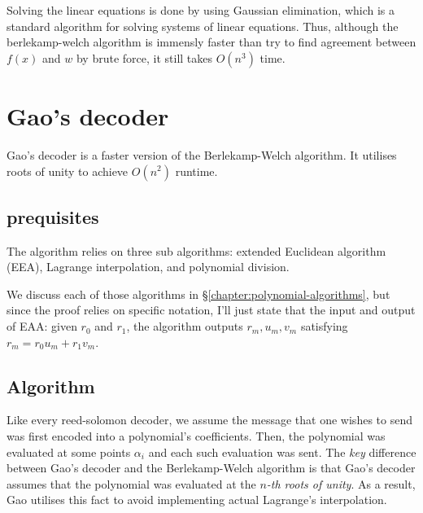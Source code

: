 Solving the linear equations is done by using Gaussian elimination,
which is a standard algorithm for solving systems of linear equations.
Thus, although the berlekamp-welch algorithm is immensly faster than try to find agreement 
between $f(x)$ and $w$ by brute force, it still takes $O(n^3)$ time. 




\section{Gao's decoder}
Gao's decoder is a faster version of the Berlekamp-Welch algorithm.
It utilises roots of unity to achieve $O(n^2)$ runtime.

\subsection{prequisites}
The algorithm relies on three sub algorithms: extended Euclidean algorithm (EEA),
Lagrange interpolation, and polynomial division.

We discuss each of those algorithms in \S\ref{chapter:polynomial-algorithms}, 
but since the proof relies on specific notation, I'll just state 
that the input and output of EAA: given $r_0$ and $r_1$, the algorithm
outputs $r_m,u_m,v_m$ satisfying $r_m=r_0u_m+r_1v_m$.

\subsection{Algorithm}
Like every reed-solomon decoder, we assume the message that one 
wishes to send was first encoded into a polynomial's coefficients.
Then, the polynomial was evaluated at some points $\alpha_i$ and 
each such evaluation was sent.
The \emph{key} difference between Gao's decoder and the Berlekamp-Welch algorithm
is that Gao's decoder assumes that the polynomial was evaluated at
the \emph{$n$-th roots of unity}.
As a result, Gao utilises this fact to avoid implementing actual Lagrange's interpolation.

